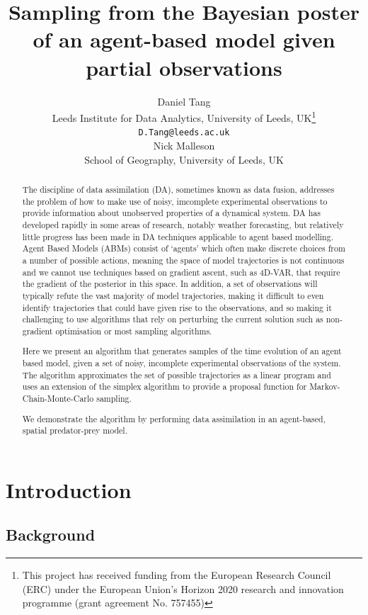 \documentclass{article}
\title{Sampling from the Bayesian poster of an agent-based model given partial observations}
\author{
  Daniel Tang\\
    Leeds Institute for Data Analytics, University of Leeds, UK\thanks{This project has received funding from the European Research Council (ERC) under the European Union’s Horizon 2020 research and innovation programme (grant agreement No. 757455)}\\
  \texttt{D.Tang@leeds.ac.uk}\\
  \AND
  Nick Malleson\\
  School of Geography, University of Leeds, UK\\  
}
\begin{document}
\maketitle

\begin{abstract}
The discipline of data assimilation (DA), sometimes known as data fusion, addresses the problem of how to make use of noisy, imcomplete experimental observations to provide information about unobserved properties of a dynamical system. DA has developed rapidly in some areas of research, notably weather forecasting, but relatively little progress has been made in DA techniques applicable to agent based modelling. Agent Based Models (ABMs) consist of `agents' which often make discrete choices from a number of possible actions, meaning the space of model trajectories is not continuous and we cannot use techniques based on gradient ascent, such as 4D-VAR, that require the gradient of the posterior in this space. In addition, a set of observations will typically refute the vast majority of model trajectories, making it difficult to even identify trajectories that could have given rise to the observations, and so making it challenging to use algorithms that rely on perturbing the current solution such as non-gradient optimisation or most sampling algorithms.

Here we present an algorithm that generates samples of the time evolution of an agent based model, given a set of noisy, incomplete experimental observations of the system. The algorithm approximates the set of possible trajectories as a linear program and uses an extension of the simplex algorithm to provide a proposal function for Markov-Chain-Monte-Carlo sampling.

We demonstrate the algorithm by performing data assimilation in an agent-based, spatial predator-prey model.
\end{abstract}


\section{Introduction}

\subsection{Background}\label{sec:background}
\end{document}
